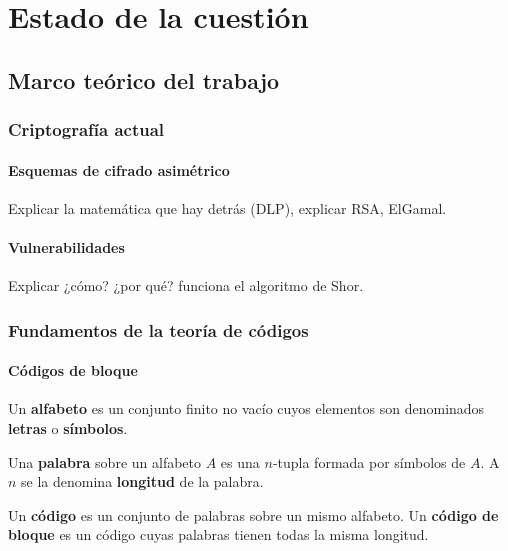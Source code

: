 \chapter{Estado de la cuestión}  

\section{Marco teórico del trabajo}

\subsection{Criptografía actual}

\subsubsection{Esquemas de cifrado asimétrico}

Explicar la matemática que hay detrás (DLP), explicar RSA, ElGamal.

\subsubsection{Vulnerabilidades}

Explicar ¿cómo? ¿por qué? funciona el algoritmo de Shor.

\subsection{Fundamentos de la teoría de códigos}

\subsubsection{Códigos de bloque}

\begin{definition}
	Un \textbf{alfabeto} es un conjunto finito no vacío cuyos elementos son denominados \textbf{letras} o \textbf{símbolos}.
\end{definition}

\begin{definition}
	Una \textbf{palabra} sobre un alfabeto $A$ es una $n$-tupla formada por símbolos de $A$. A $n$ se la denomina \textbf{longitud} de la palabra.
\end{definition}

\begin{definition}
	Un \textbf{código} es un conjunto de palabras sobre un mismo alfabeto. Un \textbf{código de bloque} es un código cuyas palabras tienen todas la misma longitud.
\end{definition}

